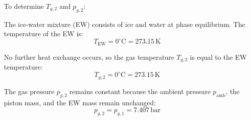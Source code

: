 To determine \( T_{g,2} \) and \( p_{g,2} \):  

The ice-water mixture (EW) consists of ice and water at phase equilibrium. The temperature of the EW is:  
\[
T_{\text{EW}} = 0^\circ\text{C} = 273.15 \, \text{K}
\]  

No further heat exchange occurs, so the gas temperature \( T_{g,2} \) is equal to the EW temperature:  
\[
T_{g,2} = 0^\circ\text{C} = 273.15 \, \text{K}
\]  

The gas pressure \( p_{g,2} \) remains constant because the ambient pressure \( p_{\text{amb}} \), the piston mass, and the EW mass remain unchanged:  
\[
p_{g,2} = p_{g,1} = 7.407 \, \text{bar}
\]